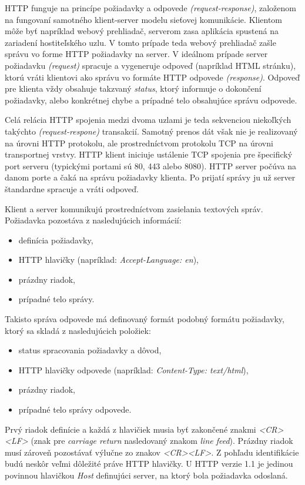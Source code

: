 \documentclass[
  digital, %
  table,   %
  lof,     %
  nolot,   %
  nocover
]{fithesis3}
\begin{document}
HTTP funguje na princípe požiadavky a odpovede \textit{(request-response)},
založenom na fungovaní samotného klient-server modelu sieťovej komunikácie. Klientom môže byť
napríklad webový prehliadač, serverom zasa aplikácia spustená na zariadení
hostiteľského uzlu. V tomto prípade teda webový prehliadač zašle správu vo
forme HTTP požiadavky na server. V ideálnom prípade server požiadavku
\textit{(request)} spracuje a vygeneruje odpoveď (napríklad HTML stránku),
ktorú vráti klientovi ako správu vo formáte HTTP odpovede \textit{(response)}.
Odpoveď pre klienta vždy obsahuje takzvaný \textit{status}, ktorý informuje o
dokončení požiadavky, alebo konkrétnej chybe a prípadné telo obsahujúce správu odpovede.

Celá relácia HTTP spojenia medzi dvoma uzlami je teda sekvenciou niekoľkých
takýchto \textit{(request-respone)} transakcií. Samotný prenos dát však nie
je realizovaný na úrovni HTTP protokolu, ale prostredníctvom protokolu TCP
na úrovni transportnej vrstvy. HTTP klient iniciuje ustálenie TCP spojenia pre
špecifický port serveru (typickými portami sú 80, 443 alebo 8080). HTTP server
počúva na danom porte a čaká na správu požiadavky klienta. Po prijatí správy ju
už server štandardne spracuje a vráti odpoveď. 

Klient a server komunikujú prostredníctvom zasielania textových správ.
Požiadavka pozostáva z nasledujúcich informácií: 
\begin{itemize}
	\item definícia požiadavky,
	\item HTTP hlavičky (napríklad: \textit{Accept-Language: en}),
	\item prázdny riadok,
	\item prípadné telo správy.
\end{itemize}

Takisto správa odpovede má definovaný formát podobný formátu požiadavky, ktorý
sa skladá z nasledujúcich položiek:
\begin{itemize}
	\item status spracovania požiadavky a dôvod,
	\item HTTP hlavičky odpovede (napríklad: \textit{Content-Type: text/html}),
	\item prázdny riadok,
	\item prípadné telo správy odpovede.
\end{itemize}

Prvý riadok definície a každá z hlavičiek musia byť zakončené znakmi
\textit{<CR><LF>}
(znak pre \textit{carriage return} nasledovaný znakom \textit{line feed}).
Prázdny riadok musí zároveň pozostávať výlučne zo znakov \textit{<CR><LF>}.
Z pohľadu identifikácie budú neskôr veľmi dôležité práve HTTP hlavičky. U HTTP
verzie 1.1 je jedinou povinnou hlavičkou \textit{Host} definujúci server, na
ktorý bola požiadavka odoslaná.
\end{document}
